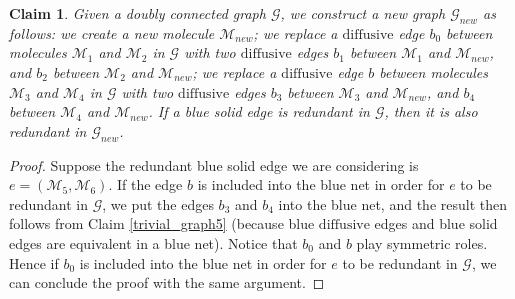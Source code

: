 \documentclass{article}
\newcommand{\1}{\mathds{1}}
\numberwithin{equation}{section}
\renewcommand{\cal}{\mathcal}
\newcommand{\dashed}{\text{diffusive}}
\theoremstyle{plain} %
\newtheorem{claim}[theorem]{Claim}
\theoremstyle{remark}
\newcommand{\cM}{{\cal M}}
\begin{document}
\begin{claim}\label{trivial_graph6}
Given a doubly connected graph $\cal G$, we construct a new graph $\cal G_{new}$ as follows: we create a new molecule $\cal M_{new}$; we replace a $\dashed$ edge $b_0$ between molecules $\cal M_1$ and $\cal M_2$ in $\cal G$ with two $\dashed$ edges $b_1$ between $\cal M_1$ and $\cal M_{new}$, and $b_2$ between $\cal M_2$ and $\cal M_{new}$; we replace a $\dashed$ edge $b$ between molecules $\cal M_3$ and $\cal M_4$ in $\cal G$ with two $\dashed$ edges $b_3$ between $\cal M_3$ and $\cal M_{new}$, and $b_4$ between $\cal M_4$ and $\cal M_{new}$. If a blue solid edge is redundant in $\cal G$, then it is also redundant in $\cal G_{new}$.
\end{claim}
\begin{proof}
Suppose the redundant blue solid edge we are considering is $e=(\cM_5,\cM_6)$. If the edge $b$ is included into the blue net in order for $e$ to be redundant in $\cal G$, we put the edges $b_3$ and $b_4$ into the blue net, and the result then follows from Claim \ref{trivial_graph5} (because blue $\dashed$ edges and blue solid edges are equivalent in a blue net). Notice that $b_0$ and $b$ play symmetric roles. Hence if $b_0$ is included into the blue net in order for $e$ to be redundant in $\cal G$, we can conclude the proof with the same argument. 


\end{proof}
\end{document}
